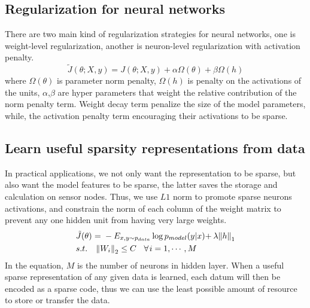 \subsection{Regularization for neural networks}

There are two main kind of regularization strategies for neural networks, one is weight-level regularization, another is neuron-level regularization with activation penalty.
\begin{equation}
\tilde J(\theta ;X,y) = J(\theta ;X,y) + \alpha \Omega (\theta )+ \beta \Omega (h)
\end{equation}
where $\Omega (\theta )$ is parameter norm penalty, $\Omega (h)$ is penalty on the activations of the units, $\alpha$,$\beta$ are hyper parameters that weight the relative contribution of
the norm penalty term. Weight decay term penalize the size of the model parameters, while, the activation penalty term encouraging their activations to be sparse.

\subsection{Learn useful sparsity representations from data}
In practical applications, we not only want the representation to be sparse, but also want the model features to be sparse, the latter saves the storage and calculation on sensor nodes. Thus, we use $L1$ norm to promote sparse neurons activations, and constrain the norm of each column of the weight matrix to prevent any one hidden unit from having very large weights.
\begin{equation}
\begin{split}
&\tilde J(\theta ){\kern 1pt} {\kern 1pt} {\kern 1pt} {\rm{ = }}{\kern 1pt} {\kern 1pt} {\kern 1pt}  - {E_{x,y \sim {p_{data}}}}\log {p_{model}}(y|x){\rm{ + }}{\kern 1pt} {\kern 1pt} \lambda {\left\| h \right\|_1}\\
& s.t.{\kern 1pt} {\kern 1pt} {\kern 1pt} {\kern 1pt} {\kern 1pt} {\kern 1pt} {\kern 1pt} {\kern 1pt} {\kern 1pt} {\kern 1pt} {\left\| {{W_i}} \right\|_2} \le C{\kern 1pt} {\kern 1pt} {\kern 1pt} {\kern 1pt} {\kern 1pt} {\kern 1pt} {\kern 1pt} {\kern 1pt} {\kern 1pt} \forall {\kern 1pt} i = 1, \cdots ,M\\
\end{split}
\end{equation}
In the equation, $M$ is the number of neurons in hidden layer.
When a useful sparse representation of any given data is learned, each datum will then be encoded as a sparse code, thus we can use the least possible amount of resource to store or transfer the data.

